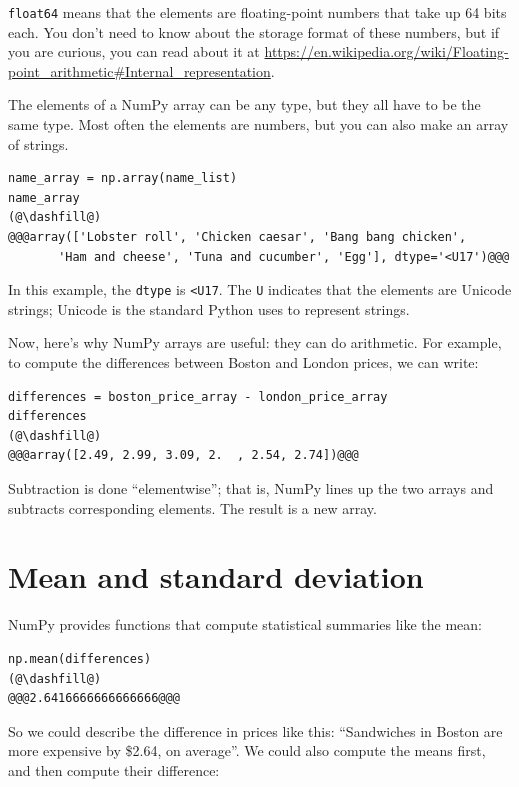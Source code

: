 \passthrough{\lstinline!float64!} means that the elements are
floating-point numbers that take up 64 bits each. You don't need to know
about the storage format of these numbers, but if you are curious, you
can read about it at
\url{https://en.wikipedia.org/wiki/Floating-point_arithmetic\#Internal_representation}.

The elements of a NumPy array can be any type, but they all have to be
the same type. Most often the elements are numbers, but you can also
make an array of strings.

\begin{lstlisting}[]
name_array = np.array(name_list)
name_array
(@\dashfill@)
@@@array(['Lobster roll', 'Chicken caesar', 'Bang bang chicken',
       'Ham and cheese', 'Tuna and cucumber', 'Egg'], dtype='<U17')@@@
\end{lstlisting}

In this example, the \passthrough{\lstinline!dtype!} is
\passthrough{\lstinline!<U17!}. The \passthrough{\lstinline!U!}
indicates that the elements are Unicode strings; Unicode is the standard
Python uses to represent strings.

Now, here's why NumPy arrays are useful: they can do arithmetic. For
example, to compute the differences between Boston and London prices, we
can write:

\begin{lstlisting}[]
differences = boston_price_array - london_price_array
differences
(@\dashfill@)
@@@array([2.49, 2.99, 3.09, 2.  , 2.54, 2.74])@@@
\end{lstlisting}

Subtraction is done ``elementwise''; that is, NumPy lines up the two
arrays and subtracts corresponding elements. The result is a new array.

\hypertarget{mean-and-standard-deviation}{%
\section{Mean and standard
deviation}\label{mean-and-standard-deviation}}

NumPy provides functions that compute statistical summaries like the
mean:

\begin{lstlisting}[]
np.mean(differences)
(@\dashfill@)
@@@2.6416666666666666@@@
\end{lstlisting}

So we could describe the difference in prices like this: ``Sandwiches in
Boston are more expensive by \$2.64, on average''. We could also compute
the means first, and then compute their difference:


